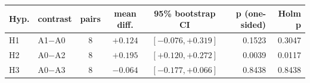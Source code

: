 \begin{tabular}{llcccrr}\toprule
Hyp. & contrast & pairs & mean diff. & 95\% bootstrap CI & p (one-sided) & Holm p \\\midrule
H1 & A1$-$A0 & 8 & $+0.124$ & $[-0.076,+0.319]$ & 0.1523 & 0.3047 \\
H2 & A0$-$A2 & 8 & $+0.195$ & $[+0.120,+0.272]$ & 0.0039 & 0.0117 \\
H3 & A0$-$A3 & 8 & $-0.064$ & $[-0.177,+0.066]$ & 0.8438 & 0.8438 \\
\bottomrule\end{tabular}